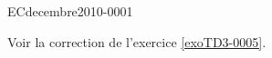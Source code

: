 
\begin{corrige}{ECdecembre2010-0001}

	Voir la correction de l'exercice \ref{exoTD3-0005}.

\end{corrige}
